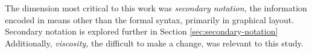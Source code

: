 The dimension most critical to this work was \emph{secondary notation,} the information encoded in means other than the formal syntax, primarily in graphical layout. Secondary notation is explored further in Section \ref{sec:secondary-notation} Additionally, \emph{viscosity,} the difficult to make a change, was relevant to this study.


